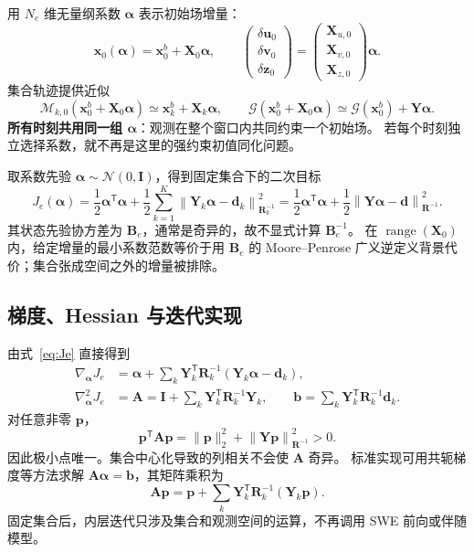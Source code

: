 \documentclass[11pt,a4paper]{article}
\newcommand{\T}{\mathsf T}
\newcommand{\Id}{\mathbf I}
\newcommand{\xx}{\mathbf x}
\newcommand{\dd}{\mathbf d}
\newcommand{\avec}{\bm\alpha}
\newcommand{\norm}[2]{\left\|#1\right\|_{#2}}
\begin{document}
用 $N_e$ 维无量纲系数 $\avec$ 表示初始场增量：
\begin{equation}
 \xx_0(\avec)=\xx_0^b+\mathbf X_0\avec,
 \qquad
 \begin{pmatrix}\delta\mathbf u_0\\\delta\mathbf v_0\\\delta\mathbf z_0\end{pmatrix}
 =\begin{pmatrix}\mathbf X_{u,0}\\\mathbf X_{v,0}\\\mathbf X_{z,0}\end{pmatrix}\avec.
 \label{eq:control}
\end{equation}
集合轨迹提供近似
\begin{equation}
 \mathcal M_{k,0}(\xx_0^b+\mathbf X_0\avec)
 \simeq\xx_k^b+\mathbf X_k\avec,\qquad
 \mathcal G(\xx_0^b+\mathbf X_0\avec)
 \simeq\mathcal G(\xx_0^b)+\mathbf Y\avec.
 \label{eq:surrogate}
\end{equation}
\textbf{所有时刻共用同一组 $\avec$}：观测在整个窗口内共同约束一个初始场。
若每个时刻独立选择系数，就不再是这里的强约束初值同化问题。

取系数先验 $\avec\sim\mathcal N(0,\Id)$，得到固定集合下的二次目标
\begin{equation}
 \boxed{J_e(\avec)=\frac12\avec^\T\avec
 +\frac12\sum_{k=1}^K\norm{\mathbf Y_k\avec-\dd_k}{\mathbf R_k^{-1}}^2
 =\frac12\avec^\T\avec+\frac12\norm{\mathbf Y\avec-\dd}{\mathbf R^{-1}}^2.}
 \label{eq:Je}
\end{equation}
其状态先验协方差为 $\mathbf B_e$，通常是奇异的，故不显式计算 $\mathbf B_e^{-1}$。
在 $\operatorname{range}(\mathbf X_0)$ 内，给定增量的最小系数范数等价于用
$\mathbf B_e$ 的 Moore--Penrose 广义逆定义背景代价；集合张成空间之外的增量被排除。

\subsection{梯度、Hessian 与迭代实现}

由式~\eqref{eq:Je} 直接得到
\begin{align}
 \nabla_{\avec}J_e
 &=\avec+\sum_k\mathbf Y_k^\T\mathbf R_k^{-1}(\mathbf Y_k\avec-\dd_k),
 \label{eq:grad}\\
 \nabla_{\avec}^2J_e
 &=\mathbf A=\Id+\sum_k\mathbf Y_k^\T\mathbf R_k^{-1}\mathbf Y_k,\qquad
 \mathbf b=\sum_k\mathbf Y_k^\T\mathbf R_k^{-1}\dd_k.
 \label{eq:A}
\end{align}
对任意非零 $\mathbf p$，
\begin{equation}
 \mathbf p^\T\mathbf A\mathbf p
 =\|\mathbf p\|_2^2+\norm{\mathbf Y\mathbf p}{\mathbf R^{-1}}^2>0.
\end{equation}
因此极小点唯一。集合中心化导致的列相关不会使 $\mathbf A$ 奇异。
标准实现可用共轭梯度等方法求解 $\mathbf A\avec=\mathbf b$，其矩阵乘积为
\begin{equation}
 \mathbf A\mathbf p=\mathbf p+
 \sum_k\mathbf Y_k^\T\mathbf R_k^{-1}(\mathbf Y_k\mathbf p).
\end{equation}
固定集合后，内层迭代只涉及集合和观测空间的运算，不再调用 SWE 前向或伴随模型。
\end{document}
